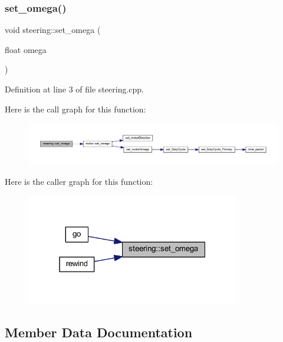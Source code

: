 \subsubsection{\texorpdfstring{set\_omega()}{set\_omega()}}
{\footnotesize\ttfamily void steering\+::set\+\_\+omega (\begin{DoxyParamCaption}\item[{float}]{omega }\end{DoxyParamCaption})}



Definition at line 3 of file steering.\+cpp.

Here is the call graph for this function\+:
\nopagebreak
\begin{figure}[H]
\begin{center}
\leavevmode
\includegraphics[width=350pt]{classsteering_a3f041a24795b6f4f886f46ca23dbc3e6_cgraph}
\end{center}
\end{figure}
Here is the caller graph for this function\+:
\nopagebreak
\begin{figure}[H]
\begin{center}
\leavevmode
\includegraphics[width=265pt]{classsteering_a3f041a24795b6f4f886f46ca23dbc3e6_icgraph}
\end{center}
\end{figure}


\subsection{Member Data Documentation}
\mbox{\label{classsteering_a59f627a3b0b3cbb4ee083c3233ea6640}} 
